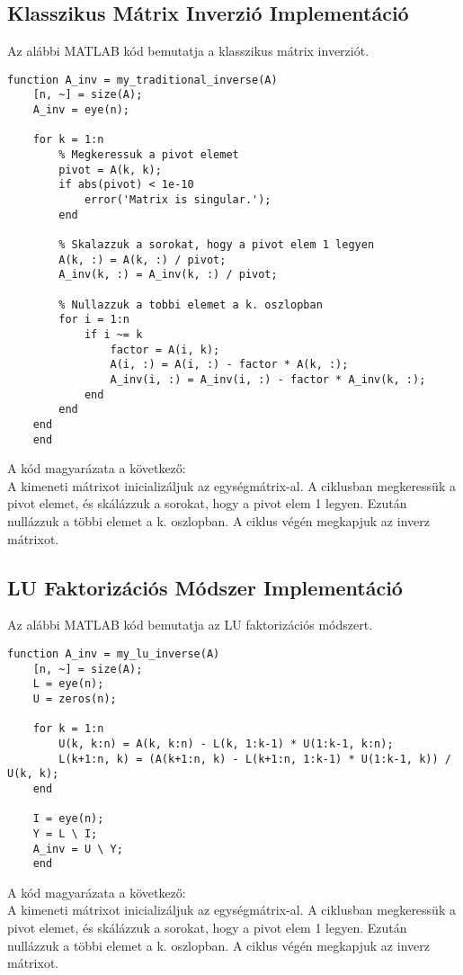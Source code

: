 \documentclass{article}
\begin{document}
\subsection{Klasszikus Mátrix Inverzió Implementáció}

Az alábbi MATLAB kód bemutatja a klasszikus mátrix inverziót.
\begin{lstlisting}[style=mystyle]
    function A_inv = my_traditional_inverse(A)
    [n, ~] = size(A);
    A_inv = eye(n);
    
    for k = 1:n
        % Megkeressuk a pivot elemet
        pivot = A(k, k);
        if abs(pivot) < 1e-10
            error('Matrix is singular.');
        end
        
        % Skalazzuk a sorokat, hogy a pivot elem 1 legyen
        A(k, :) = A(k, :) / pivot;
        A_inv(k, :) = A_inv(k, :) / pivot;
        
        % Nullazzuk a tobbi elemet a k. oszlopban
        for i = 1:n
            if i ~= k
                factor = A(i, k);
                A(i, :) = A(i, :) - factor * A(k, :);
                A_inv(i, :) = A_inv(i, :) - factor * A_inv(k, :);
            end
        end
    end
    end
\end{lstlisting}
A kód magyarázata a következő: \\ A kimeneti mátrixot inicializáljuk az
egységmátrix-al. A ciklusban megkeressük a pivot elemet, és skálázzuk a
sorokat, hogy a pivot elem 1 legyen. Ezután nullázzuk a többi elemet a k.
oszlopban. A ciklus végén megkapjuk az inverz mátrixot.

\subsection{LU Faktorizációs Módszer Implementáció}
Az alábbi MATLAB kód bemutatja az LU faktorizációs módszert.
\begin{lstlisting}[style=mystyle]
    function A_inv = my_lu_inverse(A)
    [n, ~] = size(A);
    L = eye(n);
    U = zeros(n);
    
    for k = 1:n
        U(k, k:n) = A(k, k:n) - L(k, 1:k-1) * U(1:k-1, k:n);
        L(k+1:n, k) = (A(k+1:n, k) - L(k+1:n, 1:k-1) * U(1:k-1, k)) / U(k, k);
    end
    
    I = eye(n);
    Y = L \ I;
    A_inv = U \ Y;
    end
\end{lstlisting}
A kód magyarázata a következő: \\ A kimeneti mátrixot inicializáljuk az
egységmátrix-al. A ciklusban megkeressük a pivot elemet, és skálázzuk a
sorokat, hogy a pivot elem 1 legyen. Ezután nullázzuk a többi elemet a k.
oszlopban. A ciklus végén megkapjuk az inverz mátrixot.
\end{document}
